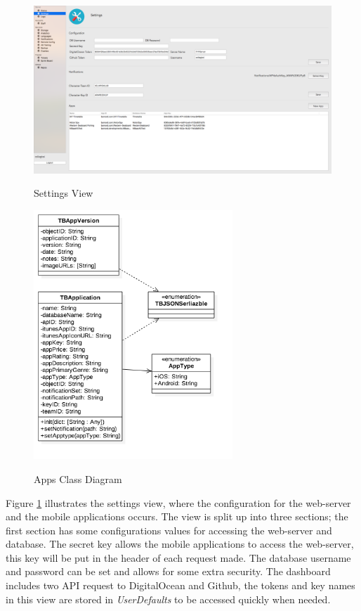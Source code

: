 \begin{figure}[!h]
    \caption{Settings View}
    \centering
    \includegraphics[width=150mm]{images/dashboard/settings}
    \label{fig:settings-view}
\end{figure}

\begin{figure}[!h]
    \caption{Apps Class Diagram}
    \centering
    \includegraphics[width=75mm]{images/classdiagrams/Settings}
    \label{fig:settings-cd}
\end{figure} 

Figure \ref{fig:settings-view} illustrates the settings view, where the configuration for the web-server and the mobile applications occurs. The view is split up into three sections; the first section has some configurations values for accessing the web-server and database. The secret key allows the mobile applications to access the web-server, this key will be put in the header of each request made. The database username and password can be set and allows for some extra security. The dashboard includes two API request to DigitalOcean and Github, the tokens and key names in this view are stored in \textit{UserDefaults} to be accessed quickly when needed.

